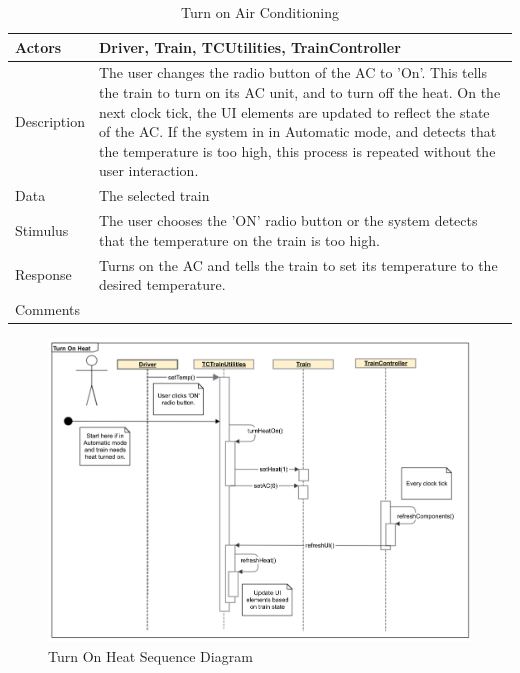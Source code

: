 \documentclass[]{article}
\begin{document}
\begin{table}[H]
	\centering
	\caption{Turn on Air Conditioning}
	\begin{tabular}{|l|l|}
		\hline
		Actors & \parbox[t]{10cm}{Driver, Train, TCUtilities, TrainController} \\ \hline
		Description & \parbox[t]{10cm}{The user changes the radio button of the AC to 'On'. This tells the train to turn on its AC unit, and to turn off the heat. On the next clock tick, the UI elements are updated to reflect the state of the AC. If the system in in Automatic mode, and detects that the temperature is too high, this process is repeated without the user interaction. } \\ \hline
		Data &  \parbox[t]{10cm}{The selected train} \\ \hline
		Stimulus &  \parbox[t]{10cm}{ The user chooses the 'ON' radio button or the system detects that the temperature on the train is too high. } \\ \hline
		Response & \parbox[t]{10cm}{Turns on the AC and tells the train to set its temperature to the desired temperature.}\\ \hline
		Comments & \parbox[t]{10cm}{}  \\ \hline
	\end{tabular}
\end{table}

\begin{figure}[H]
	\centering
	\includegraphics[width=\textwidth]{tc_turnOnHeat_usecase}
	\caption{Turn On Heat Sequence Diagram}
\end{figure}
\end{document}
